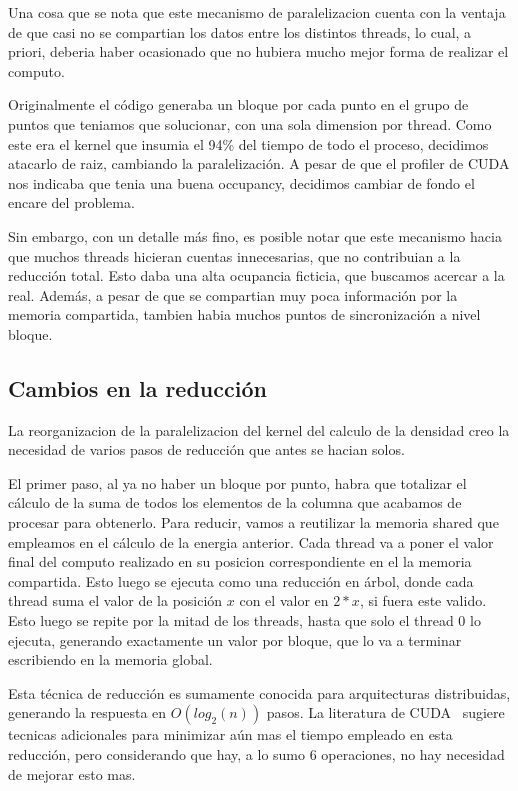 Una cosa que se nota que este mecanismo de paralelizacion cuenta con
la ventaja de que casi no se compartian los datos entre los distintos threads, lo cual,
a priori, deberia haber ocasionado que no hubiera mucho mejor forma de realizar el computo.

Originalmente el c\'odigo generaba un bloque por cada punto en el grupo de puntos
que teniamos que solucionar, con una sola dimension por thread.
Como este era el kernel que insumia el 94\% del tiempo de todo el proceso, decidimos
atacarlo de raiz, cambiando la paralelizaci\'on. A pesar de que el profiler de CUDA nos indicaba
que tenia una buena occupancy, decidimos cambiar de fondo el encare del problema.


Sin embargo, con un detalle m\'as fino, es posible notar que este mecanismo hacia que
muchos threads hicieran cuentas innecesarias, que no contribuian a la reducci\'on total.
Esto daba una alta ocupancia ficticia, que buscamos acercar a la real. Adem\'as, a pesar
de que se compartian muy poca informaci\'on por la memoria compartida, tambien habia muchos
puntos de sincronización a nivel bloque.




\subsection{Cambios en la reducci\'on}
La reorganizacion de la paralelizacion del kernel del calculo de la densidad creo la necesidad
de varios pasos de reducci\'on que antes se hacian solos.

El primer paso, al ya no haber un bloque por punto, habra que totalizar el c\'alculo de la
suma de todos los elementos de la columna que acabamos de procesar para obtenerlo. Para reducir,
vamos a reutilizar la memoria shared que empleamos en el c\'alculo de la energia anterior. Cada
thread va a poner el valor final del computo realizado en su posicion correspondiente en el
la memoria compartida. Esto luego se ejecuta como una reducci\'on en \'arbol, donde cada
thread suma el valor de la posici\'on $x$ con el valor en $2*x$, si fuera este valido. Esto
luego se repite por la mitad de los threads, hasta que solo el thread 0 lo ejecuta,
generando exactamente un valor por bloque, que lo va a terminar escribiendo en la memoria
global.

Esta t\'ecnica de reducci\'on es sumamente conocida para arquitecturas distribuidas, generando
la respuesta en $O(log_2(n))$ pasos. La literatura de CUDA~\cite{cudaReductions} sugiere tecnicas adicionales para
minimizar a\'un mas el tiempo empleado en esta reducci\'on, pero considerando que hay, a lo sumo
6 operaciones, no hay necesidad de mejorar esto mas.

